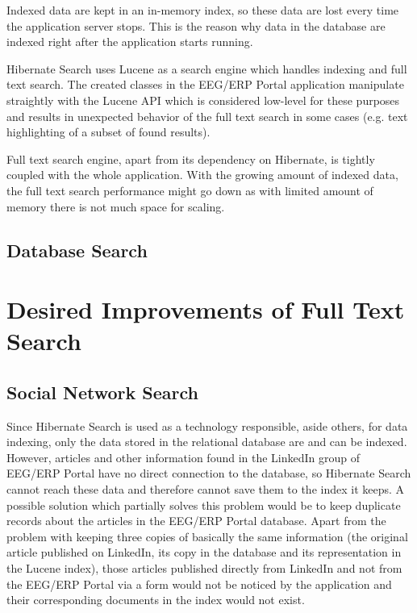 \documentclass[12pt, oneside, a4paper]{book}
\begin{document}
Indexed data are kept in an in-memory index, so these data are lost every time the application server stops. This is the reason why data in the database are indexed right after the application starts running.

Hibernate Search uses Lucene as a search engine which handles indexing
and full text search. The created classes in the EEG/ERP Portal application
manipulate straightly with the Lucene API which is considered low-level
for these purposes and results in unexpected behavior of the full
text search in some cases (e.g. text highlighting of a subset of found
results).

Full text search engine, apart from its dependency on Hibernate, is
tightly coupled with the whole application. With the growing amount
of indexed data, the full text search performance might go down as
with limited amount of memory there is not much space for scaling.


\subsection{Database Search}


\section{Desired Improvements of Full Text Search}


\subsection{Social Network Search}

Since Hibernate Search is used as a technology responsible, aside others, for data indexing, only the data stored in the relational database are and can be indexed. However, articles and other information found in the LinkedIn group of EEG/ERP Portal have no direct connection to the database, so Hibernate Search cannot reach these data and therefore cannot save them to the index it keeps. A possible solution which partially solves this problem would be to keep duplicate records about the articles in the EEG/ERP Portal database. Apart from the problem with keeping three copies of basically the same information (the original article published on LinkedIn, its copy in the database and its representation in the Lucene index), those articles published directly from LinkedIn and not from the EEG/ERP Portal via a form would not be noticed by the application and their corresponding documents in the index would not exist.
\end{document}
